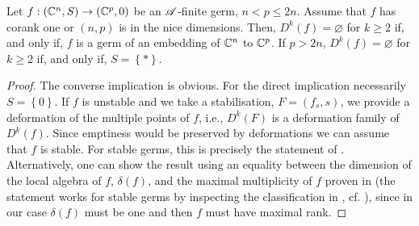 \documentclass[a4paper,12pt]{amsart}
\begin{document}

\begin{lemma}\label{lem:embeddingdk}
Let $f:(\mathbb{C}^n,S)\to(\mathbb{C}^p,0)$ be an $\mathscr{A}$-finite germ, $n<p\leq 2n$. Assume that $f$ has corank one or $(n,p)$ is in the nice dimensions. Then, $D^k(f)=\varnothing$ for $k\geq2$ if, and only if, $f$ is a germ of an embedding of $\mathbb{C}^n$ to $\mathbb{C}^p$. If $p>2n$, $D^k(f)=\varnothing$ for $k\geq2$ if, and only if, $S=\left\{*\right\}$.
\end{lemma}
\begin{proof}
The converse implication is obvious. For the direct implication necessarily $S=\left\{0\right\}$. If $f$ is unstable and we take a stabilisation, $F=(f_s,s)$, we provide a deformation of the multiple points of $f$, i.e., $D^k(F)$ is a deformation family of $D^k(f)$. Since emptiness would be preserved by deformations we can assume that $f$ is stable. For stable germs, this is precisely the statement of \cite[Proposition 9.8]{Mond2020}. Alternatively, one can show the result using an equality between the dimension of the local algebra of $f$, $\delta(f)$, and the maximal multiplicity of $f$ proven in \cite{Damon1976} (the statement works for stable germs by inspecting the classification in \cite{Mather1971}, cf. \cite[Theorem 9.1]{Mond2020}), since in our case $\delta(f)$ must be one and then $f$ must have maximal rank.
\end{proof}
\end{document}
